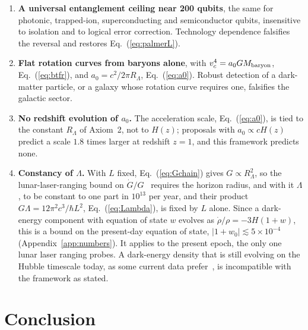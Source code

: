 \documentclass[aps,prd,twocolumn,superscriptaddress,nofootinbib,showkeys]{revtex4-2}
\begin{document}
\begin{enumerate}
\item \textbf{A universal entanglement ceiling near 200 qubits}, the same for photonic, trapped-ion, superconducting and semiconductor qubits, insensitive to isolation and to logical error correction. Technology dependence falsifies the reversal and restores Eq.~(\ref{eq:palmerL}).
\item \textbf{Flat rotation curves from baryons alone}, with $v_c^4 = a_0 G M_{\rm baryon}$, Eq.~(\ref{eq:btfr}), and $a_0 = c^2/2\pi R_\Lambda$, Eq.~(\ref{eq:a0}). Robust detection of a dark-matter particle, or a galaxy whose rotation curve requires one, falsifies the galactic sector.
\item {\boldmath\textbf{No redshift evolution of $a_0$.}} The acceleration scale, Eq.~(\ref{eq:a0}), is tied to the constant $R_\Lambda$ of Axiom~2, not to $H(z)$; proposals with $a_0\propto cH(z)$ predict a scale $1.8$ times larger at redshift $z=1$, and this framework predicts none.
\item {\boldmath\textbf{Constancy of $\Lambda$.}} With $L$ fixed, Eq.~(\ref{eq:Gchain}) gives $G\propto R_\Lambda^2$, so the lunar-laser-ranging bound on $\dot G/G$~\cite{hofmann2018} requires the horizon radius, and with it $\Lambda$, to be constant to one part in $10^{13}$ per year, and their product $G\Lambda = 12\pi^2c^3/\hbar L^2$, Eq.~(\ref{eq:Lambda}), is fixed by $L$ alone. Since a dark-energy component with equation of state $w$ evolves as $\dot\rho/\rho = -3H(1+w)$, this is a bound on the present-day equation of state, $|1+w_0| \lesssim 5\times10^{-4}$ (Appendix~\ref{app:numbers}). It applies to the present epoch, the only one lunar laser ranging probes. A dark-energy density that is still evolving on the Hubble timescale today, as some current data prefer~\cite{desi2025}, is incompatible with the framework as stated.
\end{enumerate}

\section{Conclusion}
\end{document}
